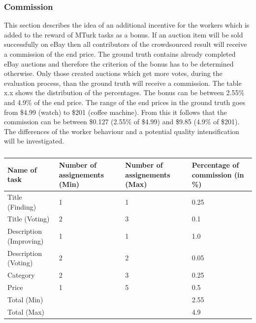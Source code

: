 \subsubsection{Commission}
This section describes the idea of an additional incentive for the workers which is added to the reward of MTurk tasks as a bonus. If an auction item will be sold successfully on eBay then all contributors of the crowdsourced result will receive a commission of the end price. The ground truth contains already completed eBay auctions and therefore the criterion of the bonus has to be determined otherwise. Only those created auctions which get more votes, during the evaluation process, than the ground truth will receive a commission. The table x.x shows the distribution of the percentages. The bonus can be between 2.55\% and 4.9\% of the end price. The range of the end prices in the ground truth goes from \$4.99 (watch) to \$201 (coffee machine). From this it follows that the commission can be between \$0.127 (2.55\% of \$4.99) and \$9.85 (4.9\% of \$201). The differences of the worker behaviour and a potential quality intensification will be investigated. 
\begin{table}[h!]
	\begin{center}
	\begin{tabular}{| l | l | l | p{10cm} |}
		\hline
		Name of task & Number of assignements (Min) & Number of assignements (Max) & Percentage of commission (in \%) \\
		\hline
		Title (Finding) & 1 & 1 & 0.25 \\
		\hline
		Title (Voting) & 2 & 3 & 0.1 \\
		\hline
		Description (Improving) & 1 & 1 & 1.0 \\
		\hline
		Description (Voting) & 2 & 2 & 0.05 \\
		\hline
		Category & 2 & 3 & 0.25 \\
		\hline
		Price & 1 & 5 & 0.5 \\
		\hline
		Total (Min) & & & 2.55 \\
		\hline
		Total (Max) & & & 4.9 \\
		\hline
	\end{tabular}
	\end{center}
	\caption{}
\end{table}

